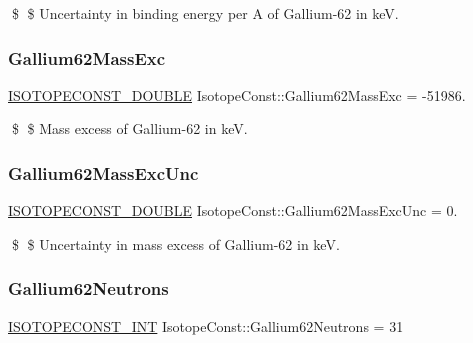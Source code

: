 \$ \$ Uncertainty in binding energy per A of Gallium-\/62 in keV. \mbox{\label{group___isotope_const-_gallium-_ga62_gabcceeec50738dbe66323430c89215d55}} 
\subsubsection{\texorpdfstring{Gallium62\+Mass\+Exc}{Gallium62MassExc}}
{\footnotesize\ttfamily \mbox{\hyperlink{group___isotope_const-_macros_ga8f45a7272ce02c0b4c65c44636ed719a}{I\+S\+O\+T\+O\+P\+E\+C\+O\+N\+S\+T\+\_\+\+D\+O\+U\+B\+LE}} Isotope\+Const\+::\+Gallium62\+Mass\+Exc = -\/51986.}

\$ \$ Mass excess of Gallium-\/62 in keV. \mbox{\label{group___isotope_const-_gallium-_ga62_gabb9bf9b8f28e79fe67304498fea591c5}} 
\subsubsection{\texorpdfstring{Gallium62\+Mass\+Exc\+Unc}{Gallium62MassExcUnc}}
{\footnotesize\ttfamily \mbox{\hyperlink{group___isotope_const-_macros_ga8f45a7272ce02c0b4c65c44636ed719a}{I\+S\+O\+T\+O\+P\+E\+C\+O\+N\+S\+T\+\_\+\+D\+O\+U\+B\+LE}} Isotope\+Const\+::\+Gallium62\+Mass\+Exc\+Unc = 0.}

\$ \$ Uncertainty in mass excess of Gallium-\/62 in keV. \mbox{\label{group___isotope_const-_gallium-_ga62_ga58346aec06ac7cff903dd25b90220040}} 
\subsubsection{\texorpdfstring{Gallium62\+Neutrons}{Gallium62Neutrons}}
{\footnotesize\ttfamily \mbox{\hyperlink{group___isotope_const-_macros_ga5f18360b3e99483a35c32d789e62621c}{I\+S\+O\+T\+O\+P\+E\+C\+O\+N\+S\+T\+\_\+\+I\+NT}} Isotope\+Const\+::\+Gallium62\+Neutrons = 31}

